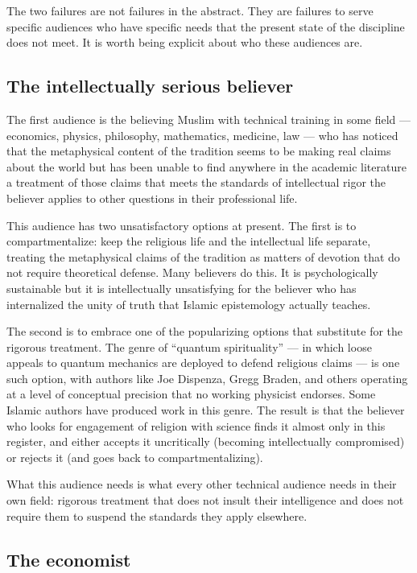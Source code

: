 The two failures are not failures in the abstract. They are failures
to serve specific audiences who have specific needs that the present
state of the discipline does not meet. It is worth being explicit
about who these audiences are.

\subsection{The intellectually serious believer}

The first audience is the believing Muslim with technical training in
some field --- economics, physics, philosophy, mathematics, medicine,
law --- who has noticed that the metaphysical content of the
tradition seems to be making real claims about the world but has
been unable to find anywhere in the academic literature a treatment
of those claims that meets the standards of intellectual rigor the
believer applies to other questions in their professional life.

This audience has two unsatisfactory options at present. The first
is to compartmentalize: keep the religious life and the intellectual
life separate, treating the metaphysical claims of the tradition as
matters of devotion that do not require theoretical defense. Many
believers do this. It is psychologically sustainable but it is
intellectually unsatisfying for the believer who has internalized the
unity of truth that Islamic epistemology actually teaches.

The second is to embrace one of the popularizing options that
substitute for the rigorous treatment. The genre of ``quantum
spirituality'' --- in which loose appeals to quantum mechanics are
deployed to defend religious claims --- is one such option, with
authors like Joe Dispenza, Gregg Braden, and others operating at a
level of conceptual precision that no working physicist endorses.
Some Islamic authors have produced work in this genre. The result is
that the believer who looks for engagement of religion with science
finds it almost only in this register, and either accepts it
uncritically (becoming intellectually compromised) or rejects it
(and goes back to compartmentalizing).

What this audience needs is what every other technical audience needs
in their own field: rigorous treatment that does not insult their
intelligence and does not require them to suspend the standards they
apply elsewhere.

\subsection{The economist}

